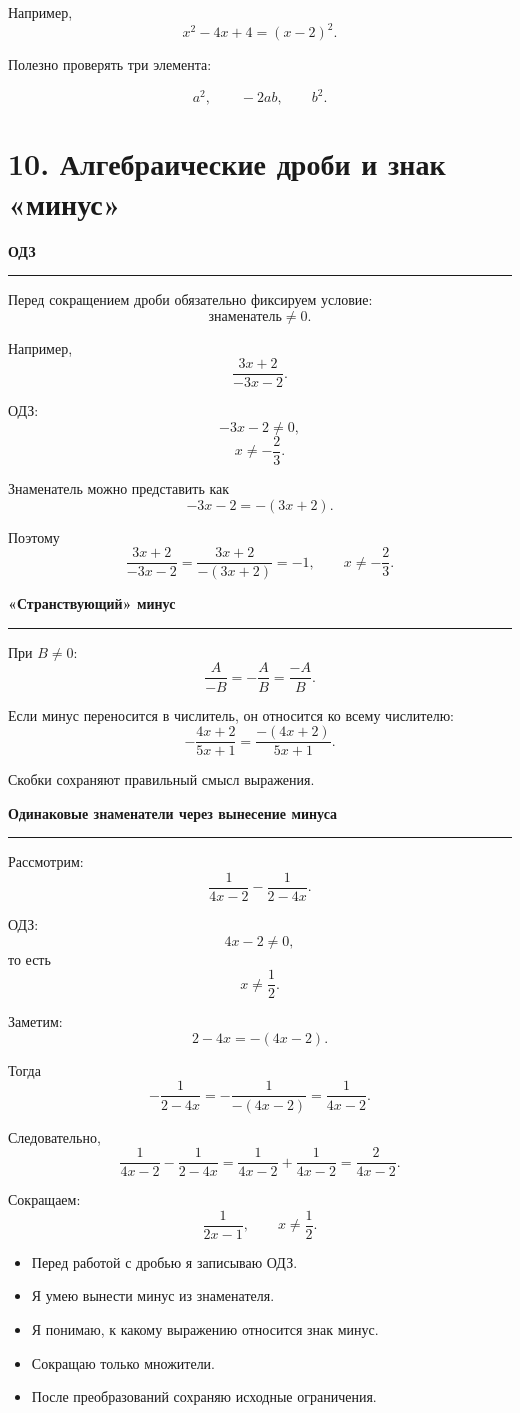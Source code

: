 \documentclass[a4paper,12pt]{article}
\newcommand{\checkitem}{\item[$\square$]}
\newcommand{\accentline}{%
    \vspace{0.2em}
    {\color{accent}\rule{\linewidth}{0.6pt}}
    \vspace{0.5em}
}
\newcommand{\topic}[1]{%
    \vspace{0.5em}
    {\large\bfseries\color{darkaccent}#1}\par
    \accentline
}
\begin{document}
Например,
\[
x^2-4x+4=(x-2)^2.
\]

Полезно проверять три элемента:

\[
a^2,\qquad -2ab,\qquad b^2.
\]


\section*{\color{darkaccent}10. Алгебраические дроби и знак «минус»}

\topic{ОДЗ}

Перед сокращением дроби обязательно фиксируем условие:
\[
\text{знаменатель}\ne0.
\]

Например,
\[
\frac{3x+2}{-3x-2}.
\]

ОДЗ:
\[
-3x-2\ne0,
\]
\[
x\ne-\frac23.
\]

Знаменатель можно представить как
\[
-3x-2=-(3x+2).
\]

Поэтому
\[
\frac{3x+2}{-3x-2}
=
\frac{3x+2}{-(3x+2)}
=
-1,
\qquad
x\ne-\frac23.
\]

\topic{«Странствующий» минус}

При $B\ne0$:
\[
\boxed{
\frac{A}{-B}
=
-\frac{A}{B}
=
\frac{-A}{B}
}.
\]

Если минус переносится в числитель, он относится ко всему числителю:
\[
-\frac{4x+2}{5x+1}
=
\frac{-(4x+2)}{5x+1}.
\]

Скобки сохраняют правильный смысл выражения.

\topic{Одинаковые знаменатели через вынесение минуса}

Рассмотрим:
\[
\frac{1}{4x-2}
-
\frac{1}{2-4x}.
\]

ОДЗ:
\[
4x-2\ne0,
\]
то есть
\[
x\ne\frac12.
\]

Заметим:
\[
2-4x=-(4x-2).
\]

Тогда
\[
-\frac{1}{2-4x}
=
-\frac{1}{-(4x-2)}
=
\frac{1}{4x-2}.
\]

Следовательно,
\[
\frac{1}{4x-2}
-
\frac{1}{2-4x}
=
\frac{1}{4x-2}
+
\frac{1}{4x-2}
=
\frac{2}{4x-2}.
\]

Сокращаем:
\[
\boxed{
\frac{1}{2x-1}
},
\qquad
x\ne\frac12.
\]

\begin{itemize}
\checkitem Перед работой с дробью я записываю ОДЗ.
\checkitem Я умею вынести минус из знаменателя.
\checkitem Я понимаю, к какому выражению относится знак минус.
\checkitem Сокращаю только множители.
\checkitem После преобразований сохраняю исходные ограничения.
\end{itemize}
\end{document}
